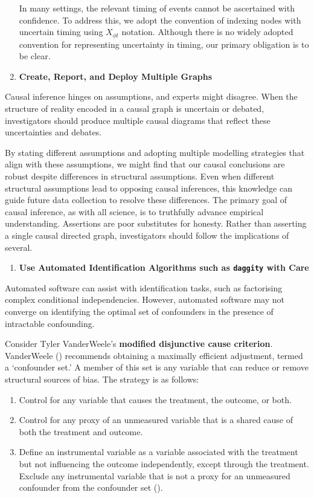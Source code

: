 \documentclass[
  single column]{article}
\providecommand{\tightlist}{%
  \setlength{\itemsep}{0pt}\setlength{\parskip}{0pt}}\usepackage{longtable,booktabs,array}
\begin{document}
\begin{enumerate}
  In many settings, the relevant timing of events cannot be ascertained
  with confidence. To address this, we adopt the convention of indexing
  nodes with uncertain timing using \(X_{\phi t}\) notation. Although
  there is no widely adopted convention for representing uncertainty in
  timing, our primary obligation is to be clear.
\item
  \textbf{Create, Report, and Deploy Multiple Graphs}
\end{enumerate}

Causal inference hinges on assumptions, and experts might disagree. When
the structure of reality encoded in a causal graph is uncertain or
debated, investigators should produce multiple causal diagrams that
reflect these uncertainties and debates.

By stating different assumptions and adopting multiple modelling
strategies that align with these assumptions, we might find that our
causal conclusions are robust despite differences in structural
assumptions. Even when different structural assumptions lead to opposing
causal inferences, this knowledge can guide future data collection to
resolve these differences. The primary goal of causal inference, as with
all science, is to truthfully advance empirical understanding.
Assertions are poor substitutes for honesty. Rather than asserting a
single causal directed graph, investigators should follow the
implications of several.

\begin{enumerate}
\def\labelenumi{\arabic{enumi}.}
\setcounter{enumi}{10}
\tightlist
\item
  \textbf{Use Automated Identification Algorithms such as
  \texttt{daggity} with Care}
\end{enumerate}

Automated software can assist with identification tasks, such as
factorising complex conditional independencies. However, automated
software may not converge on identifying the optimal set of confounders
in the presence of intractable confounding.

Consider Tyler VanderWeele's \textbf{modified disjunctive cause
criterion}. VanderWeele ()
recommends obtaining a maximally efficient adjustment, termed a
`confounder set.' A member of this set is any variable that can reduce
or remove structural sources of bias. The strategy is as follows:

\begin{enumerate}
\def\labelenumi{\alph{enumi}.}
\item
  Control for any variable that causes the treatment, the outcome, or
  both.
\item
  Control for any proxy of an unmeasured variable that is a shared cause
  of both the treatment and outcome.
\item
  Define an instrumental variable as a variable associated with the
  treatment but not influencing the outcome independently, except
  through the treatment. Exclude any instrumental variable that is not a
  proxy for an unmeasured confounder from the confounder set
  ().
\end{enumerate}
\end{document}
